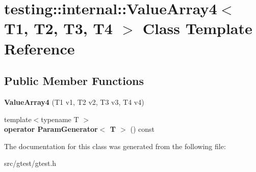\hypertarget{classtesting_1_1internal_1_1_value_array4}{}\section{testing\+:\+:internal\+:\+:Value\+Array4$<$ T1, T2, T3, T4 $>$ Class Template Reference}
\label{classtesting_1_1internal_1_1_value_array4}
\subsection*{Public Member Functions}
\begin{DoxyCompactItemize}
\item 
\mbox{\label{classtesting_1_1internal_1_1_value_array4_a5288bbb1a3149842ab13d689cf1fd48f}} 
{\bfseries Value\+Array4} (T1 v1, T2 v2, T3 v3, T4 v4)
\item 
\mbox{\label{classtesting_1_1internal_1_1_value_array4_aef21f582b20423f5fb8515d9879ad557}} 
{\footnotesize template$<$typename T $>$ }\\{\bfseries operator Param\+Generator$<$ T $>$} () const
\end{DoxyCompactItemize}


The documentation for this class was generated from the following file\+:\begin{DoxyCompactItemize}
\item 
src/gtest/gtest.\+h\end{DoxyCompactItemize}
